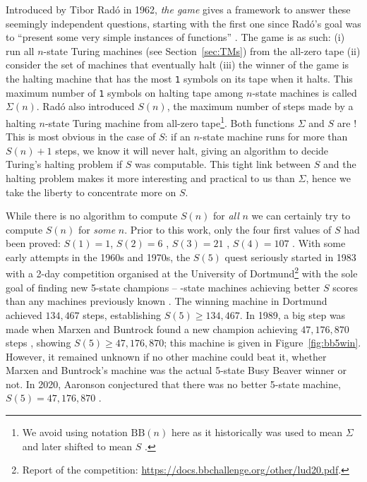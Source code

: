 \documentclass[a4paper,british]{article}
\theoremstyle{definition} %
\numberwithin{equation}{section}
\theoremstyle{definition} %
\newcommand{\sone}{\texttt{1}\xspace}
\newcommand{\BBtheFifth}{47{,}176{,}870}
\newcommand{\radofull}{Tibor Rad\'o\xspace}
\newcommand{\rado}{Rad\'o\xspace}
\begin{document}
Introduced by \radofull in 1962, \textit{the \BBfull game} gives a framework to answer these seemingly independent questions, starting with the first one since \rado's goal was to ``present some very simple instances of \noncomput functions'' \cite{Rado_1962}. The game is as such: (i) run all $n$-state Turing machines (see Section~\ref{sec:TMs}) from the all-zero tape (ii) consider the set of machines that eventually halt (iii) the winner of the game is the halting machine that has the most \sone symbols on its tape when it halts. This maximum number of \sone symbols on halting tape among $n$-state machines is called $\Sigma(n)$. \rado also introduced $S(n)$, the maximum number of steps made by a halting $n$-state Turing machine from all-zero tape\footnote{We avoid using notation $\text{BB}(n)$ here as it historically was used to mean $\Sigma$ \cite{Rado_1962, 10.5555/1151785.1151794} and later shifted to mean $S$ \cite{BusyBeaverFrontier,sterin_2022_14955828}.}. Both functions $\Sigma$ and $S$ are \noncomput! This is most obvious in the case of $S$: if an $n$-state machine runs for more than $S(n)+1$ steps, we know it will never halt, giving an algorithm to decide Turing's halting problem if $S$ was computable. This tight link between $S$ and the halting problem makes it more interesting and practical to us than $\Sigma$, hence we take the liberty to concentrate more on $S$.

While there is no algorithm to compute $S(n)$ for \textit{all} $n$ we can certainly try to compute $S(n)$ for \textit{some} $n$. Prior to this work, only the four first values of $S$ had been proved: $S(1)=1$, $S(2)=6$ \cite{Rado_1962}, $S(3) = 21$ \cite{Lin1963}, $S(4) = 107$ \cite{Brady83}. With some early attempts in the 1960s and 1970s, the $S(5)$ quest seriously started in 1983 with a 2-day competition organised at the University of Dortmund\footnote{Report of the competition: \url{https://docs.bbchallenge.org/other/lud20.pdf}.} with the sole goal of finding new 5-state champions -- -state machines achieving better $S$ scores than any machines previously known \cite{PMichel_website,michel2019busy}. The winning machine in Dortmund achieved $134,467$ steps, establishing $S(5) \geq 134,467$. In 1989, a big step was made when Marxen and Buntrock found a new champion achieving $\BBtheFifth$ steps \cite{Marxen_1990}, showing $S(5) \geq \BBtheFifth$; this machine is given in Figure~\ref{fig:bb5win}. However, it remained unknown if no other machine could beat it, \ie whether Marxen and Buntrock's machine was the actual 5-state Busy Beaver winner or not. In 2020, Aaronson conjectured that there was no better 5-state machine, \ie $S(5) = \BBtheFifth$ \cite{BusyBeaverFrontier}.
\end{document}
